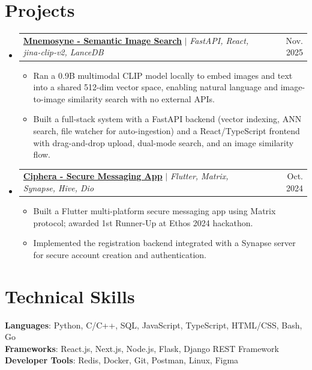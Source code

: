 \documentclass[letterpaper,11pt]{article}
\makeatletter
\newcommand{\resumeItem}[1]{
  \item\small{
    {#1 \vspace{-2pt}}
  }
}
\newcommand{\resumeProjectHeading}[2]{
    \item
    \begin{tabular*}{0.97\textwidth}{l@{\extracolsep{\fill}}r}
      \small#1 & #2 \\
    \end{tabular*}\vspace{-7pt}
}
\newcommand{\resumeSubHeadingListStart}{\begin{itemize}[leftmargin=0.15in, label={}]}
\newcommand{\resumeSubHeadingListEnd}{\end{itemize}}
\newcommand{\resumeItemListStart}{\begin{itemize}}
\newcommand{\resumeItemListEnd}{\end{itemize}\vspace{-5pt}}
\makeatother
\begin{document}
\section{Projects}
    \resumeSubHeadingListStart
      \resumeProjectHeading
        {\textbf{\href{https://github.com/samisthefbi/semantic-image-search}{Mnemosyne - Semantic Image Search}} $|$ \emph{FastAPI, React, jina-clip-v2, LanceDB}}{Nov. 2025}
        \resumeItemListStart
          \resumeItem{Ran a 0.9B multimodal CLIP model locally to embed images and text into a shared 512-dim vector space, enabling natural language and image-to-image similarity search with no external
  APIs.}
          \resumeItem{Built a full-stack system with a FastAPI backend (vector indexing, ANN search, file watcher for auto-ingestion) and a React/TypeScript frontend with drag-and-drop upload, dual-mode
  search, and an image similarity flow.}
        \resumeItemListEnd
      \resumeProjectHeading
          {\textbf{\href{https://github.com/samisthefbi/lets-chat}{Ciphera - Secure Messaging App}} $|$ \emph{Flutter, Matrix, Synapse, Hive, Dio}}{Oct. 2024}
          \resumeItemListStart
            \resumeItem{Built a Flutter multi-platform secure messaging app using Matrix protocol; awarded 1st Runner-Up at Ethos 2024 hackathon.}
            \resumeItem{Implemented the registration backend integrated with a Synapse server for secure account creation and authentication.}
          \resumeItemListEnd
    \resumeSubHeadingListEnd

%
\section{Technical Skills}
 \begin{itemize}[leftmargin=0.15in, label={}]
    \small{\item{
     \textbf{Languages}{: Python, C/C++, SQL, JavaScript, TypeScript, HTML/CSS, Bash, Go} \\
     \textbf{Frameworks}{: React.js, Next.js, Node.js, Flask, Django REST Framework} \\
     \textbf{Developer Tools}{: Redis, Docker, Git, Postman, Linux, Figma}
    }}
 \end{itemize}
\end{document}
